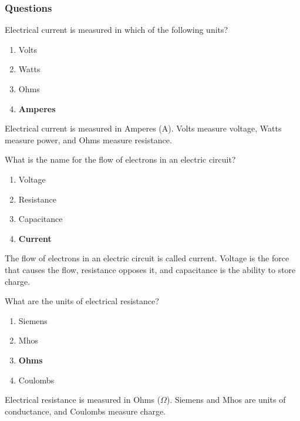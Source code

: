 \subsubsection{Questions}

\begin{tcolorbox}[colback=gray!10!white,colframe=black!75!black,title={T5A01}]
    Electrical current is measured in which of the following units?
    \begin{enumerate}[label=\Alph*),noitemsep]
        \item Volts
        \item Watts
        \item Ohms
        \item \textbf{Amperes}
    \end{enumerate}
\end{tcolorbox}
Electrical current is measured in Amperes (A). Volts measure voltage, Watts measure power, and Ohms measure resistance.

\begin{tcolorbox}[colback=gray!10!white,colframe=black!75!black,title={T5A03}]
    What is the name for the flow of electrons in an electric circuit?
    \begin{enumerate}[label=\Alph*),noitemsep]
        \item Voltage
        \item Resistance
        \item Capacitance
        \item \textbf{Current}
    \end{enumerate}
\end{tcolorbox}
The flow of electrons in an electric circuit is called current. Voltage is the force that causes the flow, resistance opposes it, and capacitance is the ability to store charge.

\begin{tcolorbox}[colback=gray!10!white,colframe=black!75!black,title={T5A04}]
    What are the units of electrical resistance?
    \begin{enumerate}[label=\Alph*),noitemsep]
        \item Siemens
        \item Mhos
        \item \textbf{Ohms}
        \item Coulombs
    \end{enumerate}
\end{tcolorbox}
Electrical resistance is measured in Ohms (\(\Omega\)). Siemens and Mhos are units of conductance, and Coulombs measure charge.

